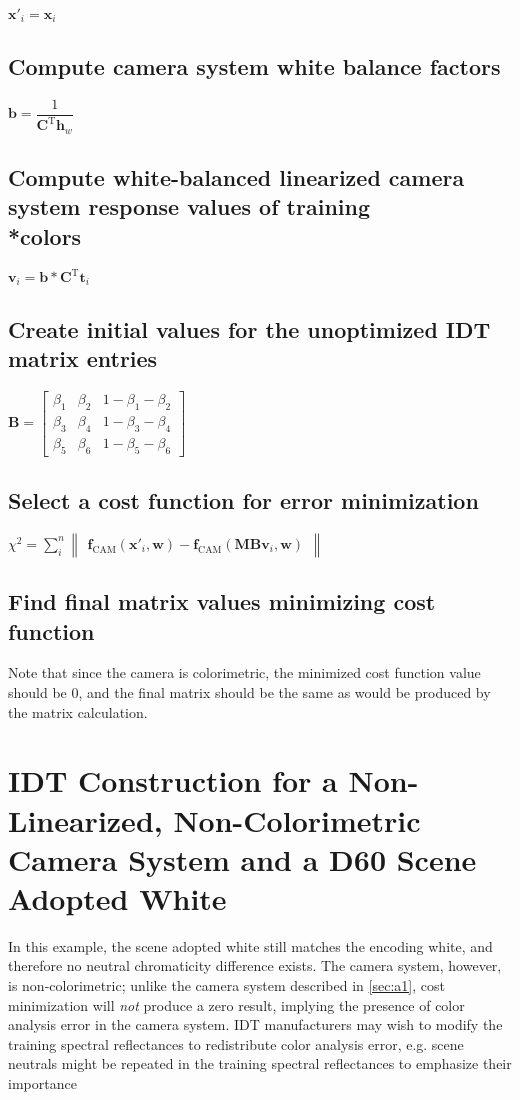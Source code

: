 $\mathbf{x}'_i=\mathbf{x}_i$

\subsection{Compute camera system white balance factors}
$\mathbf{b}=\dfrac{1}{\mathbf{C}^\mathrm{T}\mathbf{h}_w}$

\subsection{Compute white-balanced linearized camera system response values of training \\*colors}
$\mathbf{v}_i=\mathbf{b}*\mathbf{C}^\mathrm{T}\mathbf{t}_i$

\subsection{Create initial values for the unoptimized IDT matrix entries}
$   \mathbf{B} =
    \begin{bmatrix}
		\beta_1 & \beta_2 & 1-\beta_1-\beta_2 \\
		\beta_3 & \beta_4 & 1-\beta_3-\beta_4 \\
		\beta_5 & \beta_6 & 1-\beta_5-\beta_6
    \end{bmatrix}$

\subsection{Select a cost function for error minimization}
$\chi^2=\displaystyle\sum_{i}^{n}\begin{Vmatrix}\mathbf{f}_{\mathrm{CAM}}(\mathbf{x}'_i,\mathbf{w})-\mathbf{f}_{\mathrm{CAM}}(\mathbf{MBv}_i,\mathbf{w})\end{Vmatrix}$

\subsection{Find final matrix values minimizing cost function}
Note that since the camera is colorimetric, the minimized cost function value should be 0, and the final matrix should be the same as would be produced by the matrix calculation.


\section{IDT Construction for a Non-Linearized, Non-Colorimetric Camera System and a D60 Scene Adopted White}
In this example, the scene adopted white still matches the encoding white, and therefore no neutral chromaticity difference exists. The camera system, however, is non-colorimetric; unlike the camera system described in \autoref{sec:a1}, cost minimization will \textit{not} produce a zero result, implying the presence of color analysis error in the camera system. IDT manufacturers may wish to modify the training spectral reflectances to redistribute color analysis error, e.g. scene neutrals might be repeated in the training spectral reflectances to emphasize their importance

